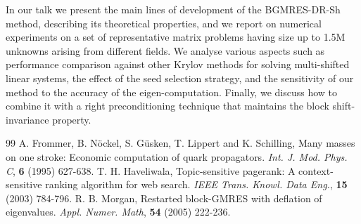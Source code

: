 \documentclass{report}
\begin{document}
In our talk we present the main lines of development of the BGMRES-DR-Sh
method, describing its theoretical properties, and we report on numerical
experiments on a set of representative matrix problems having size up to
1.5M unknowns arising from different fields. We analyse various aspects
such as performance comparison against other Krylov methods for solving
multi-shifted linear systems, the effect of the seed selection strategy,
and the sensitivity of our method to the accuracy of the
eigen-computation. Finally, we discuss how to combine it with a right
preconditioning technique that maintains the block shift-invariance
property.

{\small} \begin{thebibliography}{99}
 A. Frommer, B. N{\"o}ckel, S. G{\"u}sken, T.
Lippert and K. Schilling, Many masses on one stroke: Economic computation
of quark propagators. \emph{Int. J. Mod. Phys. C}, \textbf{6} (1995)
627-638.
 T. H. Haveliwala, Topic-sensitive pagerank:
A context-sensitive ranking algorithm for web search. \emph{IEEE Trans.
Knowl. Data Eng.}, \textbf{15} (2003) 784-796.
 R. B. Morgan, Restarted block-GMRES with deflation
of eigenvalues. \emph{Appl. Numer. Math}, \textbf{54} (2005) 222-236.
\end{thebibliography}
\end{document}
